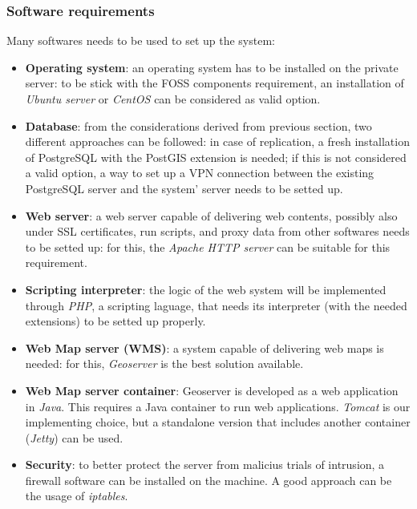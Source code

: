 \subsubsection{Software requirements}
Many softwares needs to be used to set up the system:
\begin{itemize}
    \item \textbf{Operating system}: an operating system has to be installed on the private server: to be stick with the FOSS components requirement, an installation of \textit{Ubuntu server} or \textit{CentOS} can be considered as valid option.
    \item \textbf{Database}: from the considerations derived from previous section, two different approaches can be followed: in case of replication, a fresh installation of PostgreSQL with the PostGIS extension is needed; if this is not considered a valid option, a way to set up a VPN connection between the existing PostgreSQL server and the system' server needs to be setted up.
    \item \textbf{Web server}: a web server capable of delivering web contents, possibly also under SSL certificates, run scripts, and proxy data from other softwares needs to be setted up: for this, the \textit{Apache HTTP server} can be suitable for this requirement.
    \item \textbf{Scripting interpreter}: the logic of the web system will be implemented through \textit{PHP}, a scripting laguage, that needs its interpreter (with the needed extensions) to be setted up properly.
    \item \textbf{Web Map server (WMS)}: a system capable of delivering web maps is needed: for this, \textit{Geoserver} is the best solution available.
    \item \textbf{Web Map server container}: Geoserver is developed as a web application in \textit{Java}. This requires a Java container to run web applications. \textit{Tomcat} is our implementing choice, but a standalone version that includes another container (\textit{Jetty}) can be used.
    \item \textbf{Security}: to better protect the server from malicius trials of intrusion, a firewall software can be installed on the machine. A good approach can be the usage of \textit{iptables}. 
\end{itemize}


